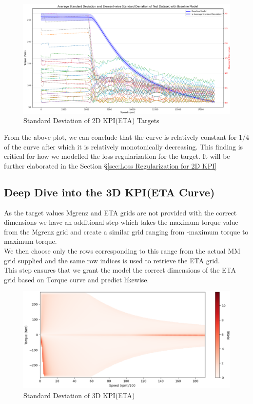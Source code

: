 \documentclass{report} %
\begin{document}
\begin{figure}[H]
    \centering
    \includegraphics[width=1\textwidth]{./ReportImages/stddev_y1.png} 
    \caption{Standard Deviation of 2D KPI(ETA) Targets} 
    \label{fig:Standard Deviation of 3D KPI(ETA) Targets}
\end{figure}

From the above plot, we can conclude that the curve is relatively constant for 1/4 of the curve after which it is relatively monotonically decreasing.
This finding is critical for how we modelled the loss regularization for the target. It will be further elaborated in the Section \S\ref{sec:Loss Regularization for 2D KPI}


\subsection{Deep Dive into the \ac{3D} KPI(ETA Curve)}\label{sec:Deep Dive into 3D KPI}
As the target values Mgrenz and ETA grids are not provided with the correct dimensions we have an additional step which takes the maximum torque value from the Mgrenz grid and create a similar grid ranging from -maximum torque to maximum torque. \\
We then choose only the rows corresponding to this range from the actual MM grid supplied and the same row indices is used to retrieve the ETA grid. \\
This step ensures that we grant the model the correct dimensions of the ETA grid based on Torque curve and predict likewise.\\


\begin{figure}[H]
    \centering
    \includegraphics[width=1\textwidth]{./ReportImages/stddev_y2.png} 
    \caption{Standard Deviation of 3D KPI(ETA)} 
    \label{fig:Standard Deviation of 3D KPI(ETA)}
\end{figure}
\end{document}
